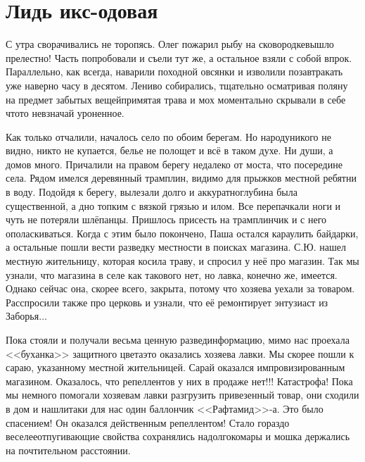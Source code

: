 \chapter{Лидь икс-одовая} 
\vepsianrose

С утра сворачивались не торопясь. Олег пожарил рыбу на сковородке\mdash вышло прелестно! Часть попробовали и съели тут же, а остальное взяли с собой впрок. Параллельно, как всегда, наварили походной овсянки и изволили позавтракать уже наверно часу в десятом. Лениво собирались, тщательно осматривая поляну на предмет забытых вещей\mdash примятая трава и мох моментально скрывали в себе что\sdash то невзначай уроненное.

Как только отчалили, началось село по обоим берегам. Но народу\mdash никого не видно, никто не купается, белье не полощет и всё в таком духе. Ни души, а домов много. Причалили на правом берегу недалеко от моста, что посередине села. Рядом имелся деревянный трамплин, видимо для прыжков местной ребятни в воду. Подойдя к берегу, вылезали долго и аккуратно\mdash глубина была существенной, а дно топким с вязкой грязью и илом. Все перепачкали ноги и чуть не потеряли шлёпанцы. Пришлось присесть на трамплинчик и с него ополаскиваться. Когда с этим было покончено, Паша остался караулить байдарки, а остальные пошли вести разведку местности в поисках магазина. С.Ю. нашел местную жительницу, которая косила траву, и спросил у неё про магазин. Так мы узнали, что магазина в селе как такового нет, но лавка, конечно же, имеется. Однако сейчас она, скорее всего, закрыта, потому что хозяева уехали за товаром. Расспросили также про церковь и узнали, что её ремонтирует энтузиаст из Заборья$\ldots$
 
Пока стояли и получали весьма ценную развединформацию, мимо нас проехала <<буханка>> защитного цвета\mdash это оказались хозяева лавки. Мы скорее пошли к сараю, указанному местной жительницей. Сарай оказался импровизированным магазином. Оказалось, что репеллентов у них в продаже нет!!! Катастрофа! Пока мы немного помогали хозяевам лавки разгрузить привезенный товар, они сходили в дом и нашли\sdash таки для нас один баллончик <<Рафтамид>>-а. Это было спасением! Он оказался действенным репеллентом! Стало гораздо веселее\mdash отпугивающие свойства сохранялись надолго\mdash комары и мошка держались на почтительном расстоянии. 

